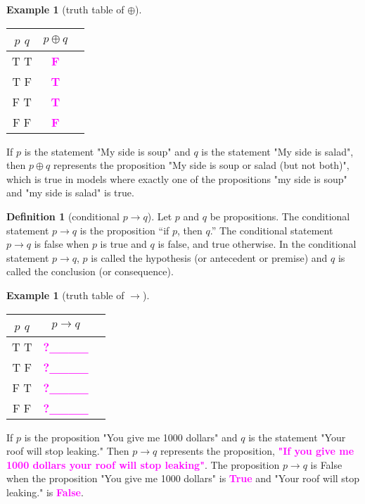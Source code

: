 \documentclass[letterpaper,10pt]{article}
\theoremstyle{plain}
\theoremstyle{definition}
\newtheorem{defn}[thm]{Definition}
\newtheorem{exmp}[thm]{Example}
\theoremstyle{remark}
\providecommand{\lxor}{\ensuremath{\oplus}}
\providecommand{\todo}[1]{\textcolor{magenta}{\textbf{#1}}}
\begin{document}
\begin{exmp}[truth table of $\lxor$]

\begin{center}
\begin{tabular}{ | c | c | c |} 
  \hline
 $p$ $q$ & $ p \lxor q$ \\
 \hline
  T T & \todo{F} \\ 
  T F & \todo{T} \\ 
  F T & \todo{T} \\ 
  F F & \todo{F} \\ 
  \hline
\end{tabular}
\end{center}
\end{exmp}
If $p$ is the statement "My side is soup" and $q$ is the statement "My side is salad", then $p \lxor q$ represents the proposition "My side is soup or salad (but not both)", which is true in models where exactly one of the propositions "my side is soup" and "my side is salad" is true.

\begin{defn}[conditional $p \to q$]
Let $p$ and $q$ be propositions. The conditional statement $p \to q$ is the proposition “if $p$, then
$q$.” The conditional statement $p \to q$ is false when $p$ is true and $q$ is false, and true otherwise.
In the conditional statement $p \to q$, $p$ is called the hypothesis (or antecedent or premise)
and $q$ is called the conclusion (or consequence).
\end{defn}
\begin{exmp}[truth table of $\to$]
\begin{center}
\begin{tabular}{ | c | c | c |} 
  \hline
 $p$ $q$ & $ p \to q$ \\
 \hline
  T T & \todo{?\_\_\_\_} \\ 
  T F & \todo{?\_\_\_\_} \\ 
  F T & \todo{?\_\_\_\_} \\ 
  F F & \todo{?\_\_\_\_} \\ 
  \hline
\end{tabular}
\end{center}
If $p$ is the proposition "You give me 1000 dollars" and $q$ is the statement "Your roof will stop leaking." Then $p \to q$ represents the proposition, 
\newline 
\todo{"If you give me 1000 dollars your roof  will stop leaking"}.
\newline
The proposition $p\to q$ is False when the proposition "You give me 1000 dollars" is \todo{True} and "Your roof will stop leaking." is \todo{False}.
\end{exmp}
\end{document}
